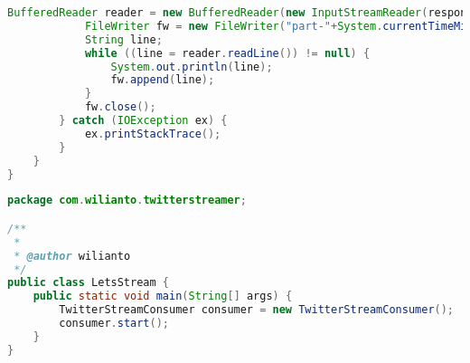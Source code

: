 \begin{lstlisting}[language=Java,basicstyle=\tiny,caption=TwitterStreamerConsumer.java]
            BufferedReader reader = new BufferedReader(new InputStreamReader(response.getStream()));
            FileWriter fw = new FileWriter("part-"+System.currentTimeMillis()+".txt");
            String line;
            while ((line = reader.readLine()) != null) {
                System.out.println(line);
                fw.append(line);
            }
            fw.close();
        } catch (IOException ex) {
            ex.printStackTrace();
        }
    }
}

\end{lstlisting}

\begin{lstlisting}[language=Java,basicstyle=\tiny,caption=LetsStream.java]
package com.wilianto.twitterstreamer;

/**
 *
 * @author wilianto
 */
public class LetsStream {
    public static void main(String[] args) {
        TwitterStreamConsumer consumer = new TwitterStreamConsumer();
        consumer.start();
    }
}
\end{lstlisting}
